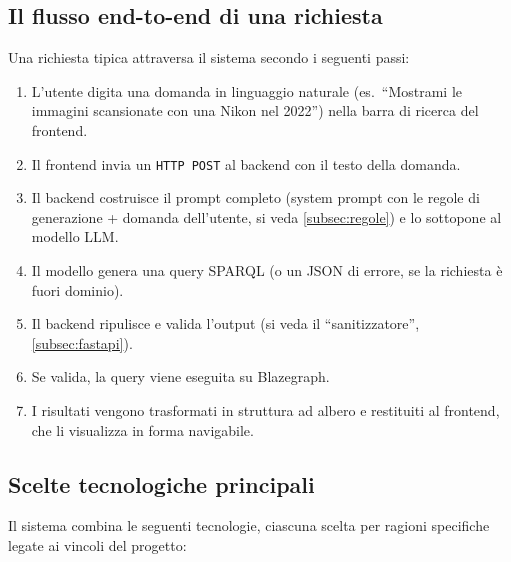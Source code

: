 \documentclass[12pt,a4paper,oneside]{book}
\newcommand{\code}[1]{\colorbox{light-gray}{\texttt{#1}}}
\begin{document}
  \subsection{Il flusso end-to-end di una richiesta}\label{subsec:flusso_e2e}

    Una richiesta tipica attraversa il sistema secondo i seguenti passi:

    \begin{enumerate}
      \item L'utente digita una domanda in linguaggio naturale (es.\ ``Mostrami le immagini scansionate con una Nikon nel 2022'') nella barra di ricerca del frontend.
      \item Il frontend invia un \code{HTTP POST} al backend con il testo della domanda.
      \item Il backend costruisce il prompt completo (system prompt con le regole di generazione + domanda dell'utente, si veda \cref{subsec:regole}) e lo sottopone al modello LLM.\@
      \item Il modello genera una query SPARQL (o un JSON di errore, se la richiesta è fuori dominio).
      \item Il backend ripulisce e valida l'output (si veda il ``sanitizzatore'', \cref{subsec:fastapi}).
      \item Se valida, la query viene eseguita su Blazegraph.
      \item I risultati vengono trasformati in struttura ad albero e restituiti al frontend, che li visualizza in forma navigabile.
    \end{enumerate}

  \subsection{Scelte tecnologiche principali}\label{subsec:scelte_tech}
    Il sistema combina le seguenti tecnologie, ciascuna scelta per ragioni specifiche legate ai vincoli del progetto:
\end{document}
